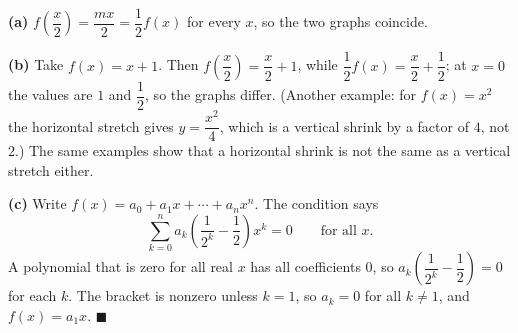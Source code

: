 \textbf{(a)} $f\left(\dfrac {x}{2}\right)=\dfrac{mx}{2}=\dfrac{1}{2}f(x)$ for every $x$, so the two graphs coincide.

\textbf{(b)} Take $f(x)=x+1$. Then $f\left(\dfrac {x}{2}\right)=\dfrac {x}{2}+1$, while $\dfrac{1}{2}f(x)=\dfrac {x}{2}+\dfrac{1}{2}$; at $x=0$ the values are $1$ and $\dfrac{1}{2}$, so the graphs differ. (Another example: for $f(x)=x^2$ the horizontal stretch gives $y=\dfrac{x^2}{4}$, which is a vertical shrink by a factor of $4$, not $2$.) The same examples show that a horizontal shrink is not the same as a vertical stretch either.

\textbf{(c)} Write $f(x)=a_0+a_1x+\cdots+a_nx^n$. The condition says
\[
\sum_{k=0}^{n}a_k\left(\dfrac{1}{2^k}-\dfrac{1}{2}\right)x^k=0\qquad\text{for all }x .
\]
A polynomial that is zero for all real $x$ has all coefficients $0$, so $a_k\left(\dfrac{1}{2^k}-\dfrac{1}{2}\right)=0$ for each $k$. The bracket is nonzero unless $k=1$, so $a_k=0$ for all $k\ne1$, and $f(x)=a_1x$. $\blacksquare$
